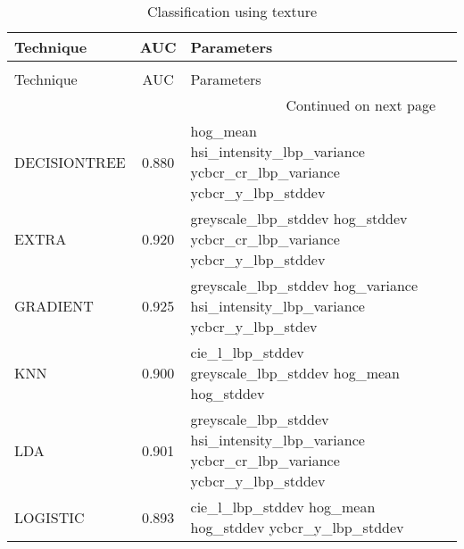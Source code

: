 \begin{longtable}{lcll}
\caption[Classification using texture]{Classification using texture}
\label{table:results-texture}\\
\toprule
   Technique &   AUC &                                                                               Parameters \\
\midrule
\endfirsthead
\caption[]{Classification using texture} \\
\toprule
   Technique &   AUC &                                                                               Parameters \\
\midrule
\endhead
\midrule
\multicolumn{3}{r}{{Continued on next page}} \\
\midrule
\endfoot

\bottomrule
\endlastfoot
DECISIONTREE & 0.880 &    \begin{minipage}[t]{0.5\textwidth}hog\_mean hsi\_intensity\_lbp\_variance ycbcr\_cr\_lbp\_variance ycbcr\_y\_lbp\_stddev \end{minipage} \vspace{3pt}\\
\midrule
EXTRA  & 0.920 & \begin{minipage}[t]{0.5\textwidth} greyscale\_lbp\_stddev hog\_stddev ycbcr\_cr\_lbp\_variance ycbcr\_y\_lbp\_stddev \end{minipage} \vspace{3pt}\\
\midrule
GRADIENT & 0.925 & \begin{minipage}[t]{0.5\textwidth}  greyscale\_lbp\_stddev hog\_variance hsi\_intensity\_lbp\_variance ycbcr\_y\_lbp\_stdev \end{minipage} \vspace{3pt}\\
\midrule
KNN & 0.900 & \begin{minipage}[t]{0.5\textwidth}cie\_l\_lbp\_stddev greyscale\_lbp\_stddev hog\_mean hog\_stddev \end{minipage}\\
\midrule
LDA  & 0.901 & \begin{minipage}[t]{0.5\textwidth} greyscale\_lbp\_stddev hsi\_intensity\_lbp\_variance ycbcr\_cr\_lbp\_variance ycbcr\_y\_lbp\_stddev \end{minipage} \vspace{3pt}\\
\midrule
LOGISTIC  & 0.893 &\begin{minipage}[t]{0.5\textwidth}  cie\_l\_lbp\_stddev hog\_mean hog\_stddev ycbcr\_y\_lbp\_stddev \end{minipage} \vspace{3pt}\\

\end{longtable}
